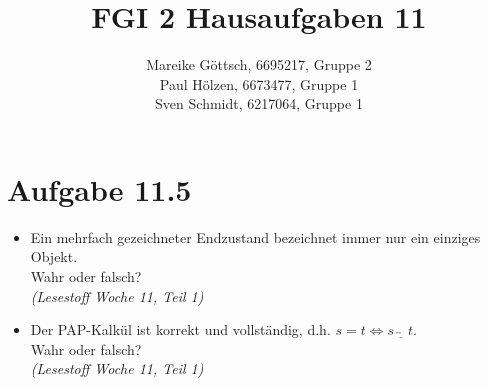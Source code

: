 \documentclass[12pt, paper=a4]{article}
\author{Mareike G\"ottsch, 6695217, Gruppe 2\\Paul H\"olzen, 6673477, Gruppe 1\\Sven Schmidt, 6217064, Gruppe 1}
\title{FGI 2 Hausaufgaben 11}
\begin{document}
\maketitle

\section*{Aufgabe 11.5}
\begin{itemize}
	\item Ein mehrfach gezeichneter Endzustand bezeichnet immer nur ein einziges Objekt. \\
		Wahr oder falsch?\\
		\textit{(Lesestoff Woche 11, Teil 1)}
	\item Der PAP-Kalk\"ul ist korrekt und vollst\"andig, d.h. \(s = t \Leftrightarrow s \overleftrightarrow{\underline{\quad}} t\).\\
		Wahr oder falsch?\\
		\textit{(Lesestoff Woche 11, Teil 1)}
\end{itemize}
\end{document}
